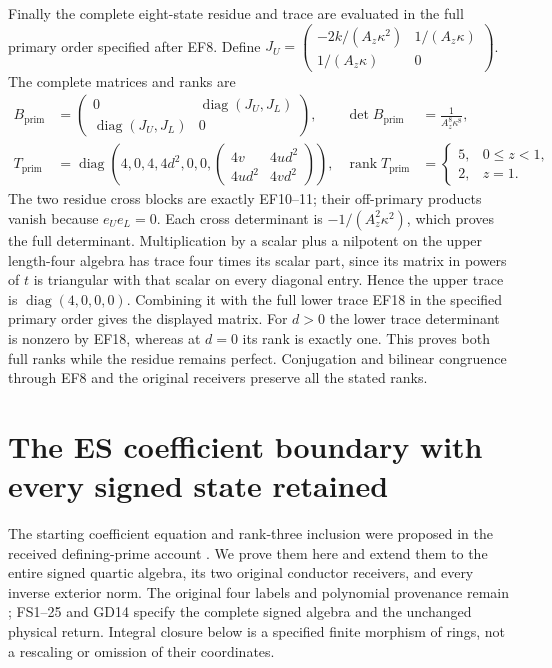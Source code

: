 \documentclass[11pt]{article}
\begin{document}
Finally the complete eight-state residue and trace
are evaluated in the full primary order specified
after EF8. Define
$J_U=\left(\begin{smallmatrix}-2k/(A_z\kappa^2)&1/(A_z\kappa)\\
1/(A_z\kappa)&0\end{smallmatrix}\right)$.
The complete matrices and ranks are
\begin{equation}
\begin{aligned}
 B_{\mathrm{prim}}&=\begin{pmatrix}
 0&\operatorname{diag}(J_U,J_L)\\
 \operatorname{diag}(J_U,J_L)&0\end{pmatrix},
 &\det B_{\mathrm{prim}}&=\frac1{A_z^8\kappa^8},\\
 T_{\mathrm{prim}}&=\operatorname{diag}\left(
 4,0,4,4d^2,0,0,
 \begin{pmatrix}4v&4ud^2\\4ud^2&4vd^2\end{pmatrix}\right),
 &\operatorname{rank}T_{\mathrm{prim}}&=
 \begin{cases}5,&0\le z<1,\\2,&z=1.\end{cases}
\end{aligned}\tag{EF25}
\end{equation}
The two residue cross blocks are exactly EF10--11;
their off-primary products vanish because $e_Ue_L=0$.
Each cross determinant is $-1/(A_z^2\kappa^2)$,
which proves the full determinant. Multiplication
by a scalar plus a nilpotent on the upper length-four
algebra has trace four times its scalar part, since
its matrix in powers of $t$ is triangular with that
scalar on every diagonal entry. Hence the upper
trace is $\operatorname{diag}(4,0,0,0)$. Combining
it with the full lower trace EF18 in the specified
primary order gives the displayed matrix. For $d>0$
the lower trace determinant is nonzero by EF18,
whereas at $d=0$ its rank is exactly one. This proves
both full ranks while the residue remains perfect.
Conjugation and bilinear congruence through EF8 and
the original receivers preserve all the stated ranks.

\section{The ES coefficient boundary with every signed state retained}
\label{sec:es-total-extension}
The starting coefficient equation and rank-three inclusion were proposed
in the received defining-prime account \cite[eqs.\ (3)--(8)]{DefiningPrimeReceived}.
We prove them here and extend them to the entire signed quartic algebra,
its two original conductor receivers, and every inverse exterior norm.
The original four labels and polynomial provenance remain
\cite{ES488,Tao}; FS1--25 and GD14 specify the complete signed algebra
and the unchanged physical return. Integral closure below is a specified
finite morphism of rings, not a rescaling or omission of their coordinates.
\end{document}
